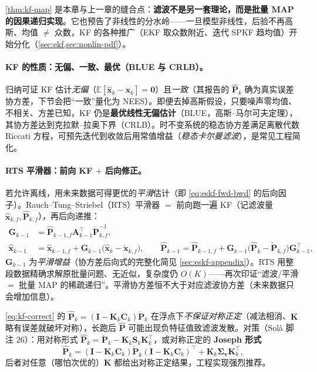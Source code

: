 \begin{insight}
\cref{thm:kf-map} 是本章与上一章的缝合点：\textbf{滤波不是另一套理论，而是批量 MAP 的因果递归实现}。它也预告了非线性的分水岭——一旦模型非线性，后验不再高斯、均值 $\neq$ 众数，KF 的各种推广（EKF 取众数附近、迭代 SPKF 趋均值）开始分化（\cref{sec:ekf,sec:nonlin-pdf}）。
\end{insight}

\paragraph{KF 的性质：无偏、一致、最优（BLUE 与 CRLB）。}
归纳可证 KF 估计\emph{无偏}（$\mathbb{E}[\hat{\mathbf{x}}_k-\mathbf{x}_k]=\mathbf{0}$）且\emph{一致}（其报告的 $\hat{\mathbf{P}}_k$ 确为真实误差协方差，下节会把“一致”量化为 NEES）。即便去掉高斯假设，只要噪声零均值、不相关、方差已知，KF 仍是\textbf{最优线性无偏估计}（BLUE，高斯–马尔可夫定理），其协方差达到克拉默–拉奥下界（CRLB）\cite{barfoot2024state}。时不变系统的稳态协方差满足离散代数 Riccati 方程，可预先迭代到收敛后用常值增益（\emph{稳态卡尔曼滤波}），是常见工程简化。

\paragraph{RTS 平滑器：前向 KF $+$ 后向修正。}
若允许离线，用未来数据可得更优的\emph{平滑}估计（即 \cref{eq:eskf-fwd-bwd} 的后向因子）。Rauch–Tung–Striebel（RTS）平滑器 $=$ 前向跑一遍 KF（记滤波量 $\hat{\mathbf{x}}_{k,f},\hat{\mathbf{P}}_{k,f}$），再后向递推：
\begin{align}
  \mathbf{G}_{k-1}&=\hat{\mathbf{P}}_{k-1,f}\mathbf{A}_{k-1}^\top\check{\mathbf{P}}_{k,f}^{-1}, \label{eq:rts}\\
  \hat{\mathbf{x}}_{k-1}&=\hat{\mathbf{x}}_{k-1,f}+\mathbf{G}_{k-1}\big(\hat{\mathbf{x}}_k-\check{\mathbf{x}}_{k,f}\big),\qquad
  \hat{\mathbf{P}}_{k-1}=\hat{\mathbf{P}}_{k-1,f}+\mathbf{G}_{k-1}\big(\hat{\mathbf{P}}_k-\check{\mathbf{P}}_{k,f}\big)\mathbf{G}_{k-1}^\top, \label{eq:rts-cov}
\end{align}
$\mathbf{G}_{k-1}$ 为\emph{平滑增益}（协方差后向式的完整化简见 \cref{sec:eskf-appendix}）。RTS 用整段数据精确求解原批量问题、无近似，复杂度仍 $O(K)$——再次印证“滤波/平滑 $=$ 批量 MAP 的稀疏递归”\cite{barfoot2024state}。平滑协方差恒不大于对应滤波协方差（未来数据只会增加信息）。

\begin{pitfall}
\cref{eq:kf-correct} 的 $\hat{\mathbf{P}}_k=(\mathbf{I}-\mathbf{K}_k\mathbf{C}_k)\check{\mathbf{P}}_k$ 在浮点下\emph{不保证对称正定}（减法相消、$\mathbf{K}$ 略有误差就破坏对称），长跑后 $\hat{\mathbf{P}}$ 可能出现负特征值致滤波发散。对策（Solà\cite{sola2017quaternion} 脚注 26）：用对称形式 $\hat{\mathbf{P}}_k=\check{\mathbf{P}}_k-\mathbf{K}_k\mathbf{S}_k\mathbf{K}_k^\top$，或对称正定的 \textbf{Joseph 形式}
\[
  \hat{\mathbf{P}}_k=(\mathbf{I}-\mathbf{K}_k\mathbf{C}_k)\check{\mathbf{P}}_k(\mathbf{I}-\mathbf{K}_k\mathbf{C}_k)^\top+\mathbf{K}_k\boldsymbol{\Sigma}_{\mathbf{v}}\mathbf{K}_k^\top,
\]
后者对任意（哪怕次优的）$\mathbf{K}$ 都给出对称正定结果，工程实现强烈推荐。
\end{pitfall}


